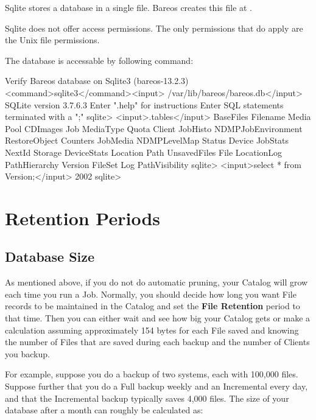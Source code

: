 Sqlite stores a database in a single file.
Bareos creates this file at .

Sqlite does not offer access permissions. The only permissions that do apply are the Unix file permissions.

The database is accessable by following command:
\begin{commands}{Verify Bareos database on Sqlite3 (bareos-13.2.3)}
<command>sqlite3</command><input> /var/lib/bareos/bareos.db</input>
SQLite version 3.7.6.3
Enter ".help" for instructions
Enter SQL statements terminated with a ";"
sqlite> <input>.tables</input>
BaseFiles           Filename            Media               Pool
CDImages            Job                 MediaType           Quota
Client              JobHisto            NDMPJobEnvironment  RestoreObject
Counters            JobMedia            NDMPLevelMap        Status
Device              JobStats            NextId              Storage
DeviceStats         Location            Path                UnsavedFiles
File                LocationLog         PathHierarchy       Version
FileSet             Log                 PathVisibility
sqlite> <input>select * from Version;</input>
2002
sqlite>
\end{commands}




\section{Retention Periods}

\subsection{Database Size}

As mentioned above, if you do not do automatic pruning, your Catalog will grow
each time you run a Job. Normally, you should decide how long you want File
records to be maintained in the Catalog and set the {\bf File Retention}
period to that time. Then you can either wait and see how big your Catalog
gets or make a calculation assuming approximately 154 bytes for each File
saved and knowing the number of Files that are saved during each backup and
the number of Clients you backup.

For example, suppose you do a backup of two systems, each with 100,000 files.
Suppose further that you do a Full backup weekly and an Incremental every day,
and that the Incremental backup typically saves 4,000 files. The size of your
database after a month can roughly be calculated as:

